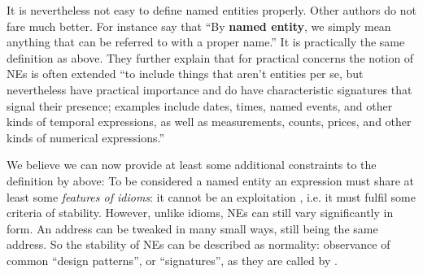 It is nevertheless not easy to define named entities properly. Other authors do not fare much better.
For instance \citet{salp} say that ``By \textbf{named entity}, we simply mean anything that can be referred to with a proper name.'' It is practically the same definition as above. They further explain that for practical concerns the notion of NEs is often extended ``to include things that aren't entities per se, but nevertheless have practical importance and do have characteristic signatures that signal their presence; examples include dates, times, named events, and other kinds of temporal expressions, as well as measurements, counts, prices, and other kinds of numerical expressions.''

We believe we can now provide at least some additional constraints to the definition by \citeauthor{sevcikova:2007} above: To be considered a named entity an expression must share at least some 
\emph{features of idioms}: it cannot be an exploitation \citep[see][]{hanks:norms}, i.e. it must fulfil some criteria of stability. However, unlike idioms, NEs can still vary significantly in form. An address can be tweaked in many small ways, still being the same address. So the stability of NEs can be described as normality: observance of common ``design patterns'', or ``signatures'', as they are called by \citeauthor{salp}. 


